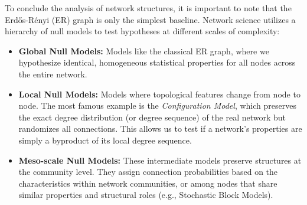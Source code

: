 To conclude the analysis of network structures, it is important to note that the Erdős-Rényi (ER) graph is only the simplest baseline. Network science utilizes a hierarchy of null models to test hypotheses at different scales of complexity:

\begin{itemize}
    \item \textbf{Global Null Models:} Models like the classical ER graph, where we hypothesize identical, homogeneous statistical properties for all nodes across the entire network.
    \item \textbf{Local Null Models:} Models where topological features change from node to node. The most famous example is the \textit{Configuration Model}, which preserves the exact degree distribution (or degree sequence) of the real network but randomizes all connections. This allows us to test if a network's properties are simply a byproduct of its local degree sequence.
    \item \textbf{Meso-scale Null Models:} These intermediate models preserve structures at the community level. They assign connection probabilities based on the characteristics within network communities, or among nodes that share similar properties and structural roles (e.g., Stochastic Block Models).
\end{itemize}